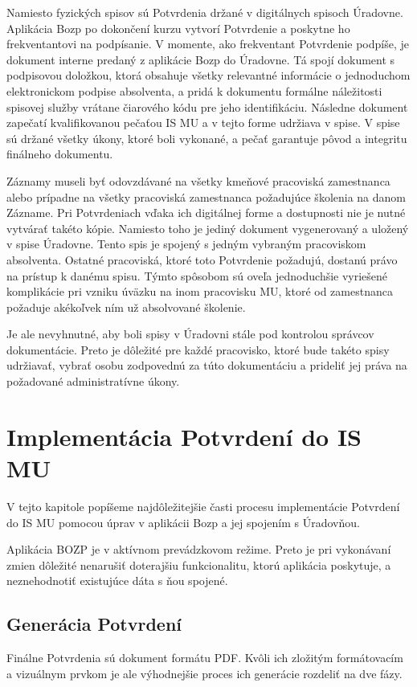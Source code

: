 \documentclass[
  digital,     %
  oneside,     %
  nosansbold,  %
  nocolorbold, %
  lof,         %
  nolot,         %
]{fithesis4}
\begin{document}
Namiesto fyzických spisov sú Potvrdenia držané v digitálnych spisoch Úradovne. Aplikácia Bozp po dokončení kurzu vytvorí Potvrdenie a poskytne ho frekventantovi na podpísanie. V momente, ako frekventant Potvrdenie podpíše, je dokument interne predaný z aplikácie Bozp do Úradovne. Tá spojí dokument s podpisovou doložkou, ktorá obsahuje všetky relevantné informácie o jednoduchom elektronickom podpise absolventa, a pridá k dokumentu formálne náležitosti spisovej služby vrátane čiarového kódu pre jeho identifikáciu. Následne dokument zapečatí kvalifikovanou pečaťou IS MU a v tejto forme udržiava v spise. V spise sú držané všetky úkony, ktoré boli vykonané, a pečať garantuje pôvod a integritu finálneho dokumentu.

Záznamy museli byť odovzdávané na všetky kmeňové pracoviská zamestnanca alebo prípadne na všetky pracoviská zamestnanca požadujúce školenia na danom Zázname. Pri Potvrdeniach vďaka ich digitálnej forme a dostupnosti nie je nutné vytvárať takéto kópie. Namiesto toho je jediný dokument vygenerovaný a uložený v spise Úradovne. Tento spis je spojený s jedným vybraným pracoviskom absolventa. Ostatné pracoviská, ktoré toto Potvrdenie požadujú, dostanú právo na prístup k danému spisu. Týmto spôsobom sú oveľa jednoduchšie vyriešené komplikácie pri vzniku úväzku na inom pracovisku MU, ktoré od zamestnanca požaduje akékoľvek ním už absolvované školenie.

Je ale nevyhnutné, aby boli spisy v Úradovni stále pod kontrolou správcov dokumentácie. Preto je dôležité pre každé pracovisko, ktoré bude takéto spisy udržiavať, vybrať osobu zodpovednú za túto dokumentáciu a prideliť jej práva na požadované administratívne úkony.

\chapter{Implementácia Potvrdení do IS MU}
V tejto kapitole popíšeme najdôležitejšie časti procesu implementácie Potvrdení do IS MU pomocou úprav v aplikácii Bozp a jej spojením s Úradovňou.

Aplikácia BOZP je v aktívnom prevádzkovom režime. Preto je pri vykonávaní zmien dôležité nenarušiť doterajšiu funkcionalitu, ktorú aplikácia poskytuje, a neznehodnotiť existujúce dáta s ňou spojené.

\section{Generácia Potvrdení}
Finálne Potvrdenia sú dokument formátu PDF. Kvôli ich zložitým formátovacím a vizuálnym prvkom je ale výhodnejšie proces ich generácie rozdeliť na dve fázy.
\end{document}

